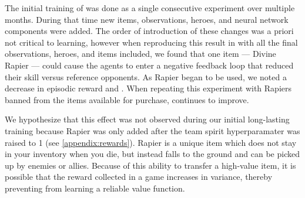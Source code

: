 \documentclass[ocean-paper.tex]{subfiles}
\begin{document}
The initial training of \openaifive was done as a single consecutive experiment over multiple months. During that time new items, observations, heroes, and neural network components were added. The order of introduction of these changes was a priori not critical to learning, however when reproducing this result in \cleanexpname with all the final observations, heroes, and items included, we found that one item --- Divine Rapier --- could cause the agents to enter a negative feedback loop that reduced their skill versus reference opponents. As Rapier began to be used, we noted a decrease in episodic reward and \trueskillname. When repeating this experiment with Rapiers banned from the items available for purchase, \trueskillname continues to improve.

We hypothesize that this effect was not observed during our initial long-lasting training because Rapier was only added after the team spirit hyperparamater was raised to 1 (see \autoref{appendix:rewards}). Rapier is a unique item which does not stay in your inventory when you die, but instead falls to the ground and can be picked up by enemies or allies. Because of this ability to transfer a high-value item, it is possible that the reward collected in a game increases in variance, thereby preventing \openaifive from learning a reliable value function.

\end{document}
